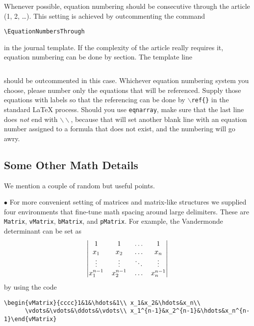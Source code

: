 \documentclass[ijds,nonblindrev]{informs4}
\begin{document}
Whenever possible, equation numbering should be consecutive through the 
article (1, 2, \ldots). This setting is achieved by outcommenting the command

\begin{Verbatim}[fontsize=\small]
      \EquationNumbersThrough
\end{Verbatim}

\noindent
in the journal template. If the complexity of the article really requires 
it, equation numbering can be done by section. The template line
\begin{Verbatim}[fontsize=\small]
     %\EquationNumbersBySection
\end{Verbatim}

\noindent
should be outcommented in this case. Whichever equation numbering system you 
choose, please number only the equations that will be referenced. Supply 
those equations with labels so that the referencing can be done by
\texttt{$\backslash $ref\{\}} in the standard LaTeX process. Should you use  
\texttt{eqnarray}, make sure that the last line does {\it not} end
with \texttt{$\backslash \backslash $}, because that will set another blank line with  
an equation number assigned to a formula that does not exist, and the 
numbering will go awry.

\subsection{Some Other Math Details}\label{sec5.4}

We mention a couple of random but useful points.

$\bullet$ For more convenient setting of matrices and matrix-like structures we 
supplied four environments that fine-tune math spacing around large 
delimiters. These are \texttt{Matrix}, \texttt{vMatrix},
\texttt{bMatrix}, and \texttt{pMatrix}. For example, the Vandermonde determinant  
can be set as
\begin{align*}
\arraycolsep6pt\begin{vmatrix}1&1&\hdots&1\\ x_1&x_2&\hdots&x_n\\
\vdots&\vdots&\ddots&\vdots\\ x_1^{n-1}& x_2^{n-1}&\hdots&x_n^{n-1}
\end{vmatrix}
\end{align*}
by using the code
\begin{Verbatim}[fontsize=\small,xleftmargin=-0.5in]
      \begin{vMatrix}{cccc}1&1&\hdots&1\\ x_1&x_2&\hdots&x_n\\
      \vdots&\vdots&\ddots&\vdots\\ x_1^{n-1}&x_2^{n-1}&\hdots&x_n^{n-1}\end{vMatrix}
\end{Verbatim}
      
\end{document}
